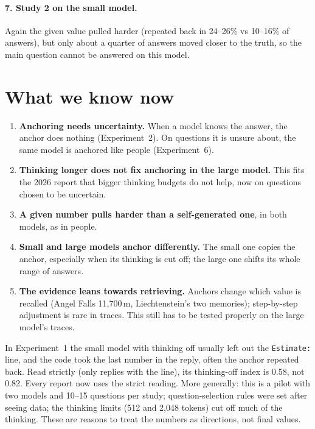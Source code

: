 \documentclass[11pt,a4paper]{article}
\begin{document}
\paragraph{7. Study 2 on the small model.} Again the given value pulled harder (repeated back in 24--26\% vs 10--16\% of answers), but only about a quarter of answers moved closer to the truth, so the main question cannot be answered on this model.


\section{What we know now}
\begin{enumerate}[leftmargin=*]
  \item \textbf{Anchoring needs uncertainty.} When a model knows the answer, the anchor does nothing (Experiment~2). On questions it is unsure about, the same model is anchored like people (Experiment~6).
  \item \textbf{Thinking longer does not fix anchoring in the large model.} This fits the 2026 report that bigger thinking budgets do not help, now on questions chosen to be uncertain.
  \item \textbf{A given number pulls harder than a self-generated one}, in both models, as in people.
  \item \textbf{Small and large models anchor differently.} The small one copies the anchor, especially when its thinking is cut off; the large one shifts its whole range of answers.
  \item \textbf{The evidence leans towards retrieving.} Anchors change which value is recalled (Angel Falls 11,700\,m, Liechtenstein's two memories); step-by-step adjustment is rare in traces. This still has to be tested properly on the large model's traces.
\end{enumerate}

\begin{cautionbox}
In Experiment~1 the small model with thinking off usually left out the \texttt{Estimate:} line, and the code took the last number in the reply, often the anchor repeated back. Read strictly (only replies with the line), its thinking-off index is 0.58, not 0.82. Every report now uses the strict reading. More generally: this is a pilot with two models and 10--15 questions per study; question-selection rules were set after seeing data; the thinking limits (512 and 2,048 tokens) cut off much of the thinking. These are reasons to treat the numbers as directions, not final values.
\end{cautionbox}
\end{document}
